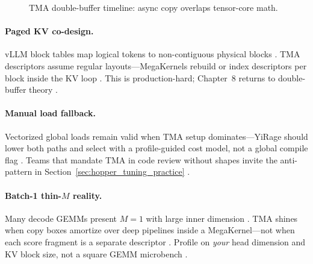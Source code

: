 \begin{figure}[t]
\centering
{}
\caption{TMA double-buffer timeline: async copy overlaps tensor-core math.}
\label{fig:tma_pipeline}
\end{figure}

\paragraph{Paged KV co-design.}
vLLM block tables map logical tokens to non-contiguous physical blocks \citep{kwon2023vllm}.
TMA descriptors assume regular layouts---MegaKernels rebuild or index descriptors per block inside the KV loop \citep{dao2023flashdecoding,yirage2026}.
This is production-hard; Chapter~8 returns to double-buffer theory \citep{semianalysis2024tma}.

\paragraph{Manual load fallback.}
Vectorized global loads remain valid when TMA setup dominates---YiRage should lower both paths and select with a profile-guided cost model, not a global compile flag \citep{yirage2026,taxbreak2026,dlbook}.
Teams that mandate TMA in code review without shapes invite the anti-pattern in Section~\ref{sec:hopper_tuning_practice} \citep{patel2025llminference}.

\paragraph{Batch-1 thin-$M$ reality.}
Many decode GEMMs present $M{=}1$ with large inner dimension \citep{dlbook,taxbreak2026}.
TMA shines when copy boxes amortize over deep pipelines inside a MegaKernel---not when each score fragment is a separate descriptor \citep{semianalysis2024tma,yirage2026}.
Profile on \emph{your} head dimension and KV block size, not a square GEMM microbench \citep{patel2025llminference,memoryfloor2026}.

